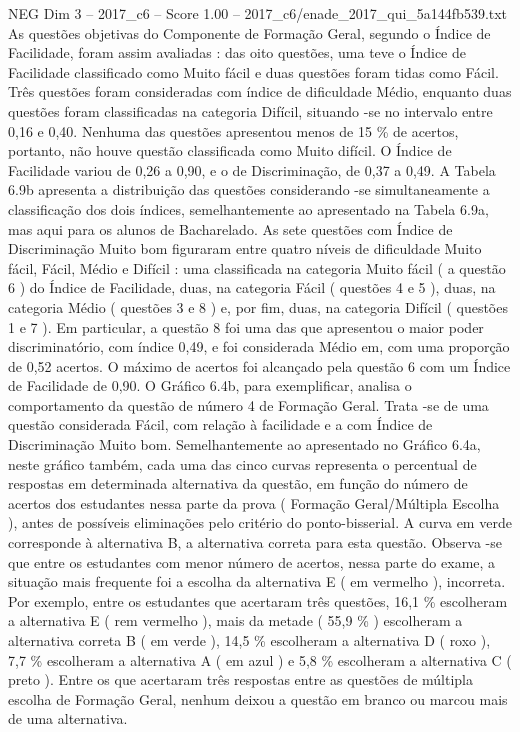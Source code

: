 \begin{textsample}{NEG Dim 3 – 2017\_c6 – Score 1.00 – 2017\_c6/enade\_2017\_qui\_5a144fb539.txt}
As questões objetivas do Componente de Formação Geral, segundo o Índice de Facilidade, foram assim avaliadas : das oito questões, uma teve o Índice de Facilidade classificado como Muito fácil e duas questões foram tidas como Fácil.
Três questões foram consideradas com índice de dificuldade Médio, enquanto duas questões foram classificadas na categoria Difícil, situando -se no intervalo entre 0,16 e 0,40.
Nenhuma das questões apresentou menos de 15 \% de acertos, portanto, não houve questão classificada como Muito difícil.
O Índice de Facilidade variou de 0,26 a 0,90, e o de Discriminação, de 0,37 a 0,49.
A Tabela 6.9b apresenta a distribuição das questões considerando -se simultaneamente a classificação dos dois índices, semelhantemente ao apresentado na Tabela 6.9a, mas aqui para os alunos de Bacharelado.
As sete questões com Índice de Discriminação Muito bom figuraram entre quatro níveis de dificuldade Muito fácil, Fácil, Médio e Difícil : uma classificada na categoria Muito fácil ( a questão 6 ) do Índice de Facilidade, duas, na categoria Fácil ( questões 4 e 5 ), duas, na categoria Médio ( questões 3 e 8 ) e, por fim, duas, na categoria Difícil ( questões 1 e 7 ).
Em particular, a questão 8 foi uma das que apresentou o maior poder discriminatório, com índice 0,49, e foi considerada Médio em, com uma proporção de 0,52 acertos.
O máximo de acertos foi alcançado pela questão 6 com um Índice de Facilidade de 0,90.
O Gráfico 6.4b, para exemplificar, analisa o comportamento da questão de número 4 de Formação Geral.
Trata -se de uma questão considerada Fácil, com relação à facilidade e a com Índice de Discriminação Muito bom.
Semelhantemente ao apresentado no Gráfico 6.4a, neste gráfico também, cada uma das cinco curvas representa o percentual de respostas em determinada alternativa da questão, em função do número de acertos dos estudantes nessa parte da prova ( Formação Geral/Múltipla Escolha ), antes de possíveis eliminações pelo critério do ponto-bisserial.
A curva em verde corresponde à alternativa B, a alternativa correta para esta questão.
Observa -se que entre os estudantes com menor número de acertos, nessa parte do exame, a situação mais frequente foi a escolha da alternativa E ( em vermelho ), incorreta.
Por exemplo, entre os estudantes que acertaram três questões, 16,1 \% escolheram a alternativa E ( rem vermelho ), mais da metade ( 55,9 \% ) escolheram a alternativa correta B ( em verde ), 14,5 \% escolheram a alternativa D ( roxo ), 7,7 \% escolheram a alternativa A ( em azul ) e 5,8 \% escolheram a alternativa C ( preto ).
Entre os que acertaram três respostas entre as questões de múltipla escolha de Formação Geral, nenhum deixou a questão em branco ou marcou mais de uma alternativa.

\end{textsample}
